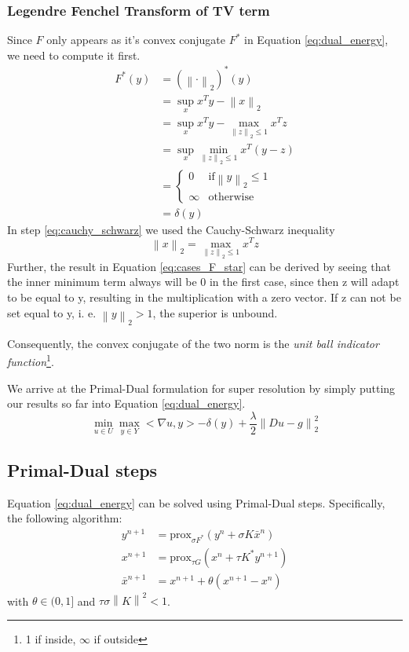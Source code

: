 \documentclass{paper}
\newcommand{\prox}{\text{prox}}
\newcommand{\norm}[1]{\left\lVert#1\right\rVert}
\newcommand{\twonorm}[1]{\left\lVert#1\right\rVert_2}
\begin{document}
\subsubsection*{Legendre Fenchel Transform of TV term}
Since $F$ only appears as it's convex conjugate $F^*$ in Equation \eqref{eq:dual_energy}, we need to compute it first.
\begin{align}
	F^*(y) &= (\norm{\cdot}_2)^*(y) \\
		  &= \sup_x x^T y - \twonorm{x} \\
		  &= \sup_x x^T y - \max_{\twonorm{z} \leq 1} x^T z \label{eq:cauchy_schwarz}\\
		  &= \sup_x \min_{\twonorm{z} \leq 1} x^T(y-z) \\
		  &= \begin{cases}
   				0  			& \text{if} \twonorm{y} \leq 1 \\
   				\infty      & \text{otherwise}
  			 \end{cases} \label{eq:cases_F_star} \\
  	      &= \delta(y)
\end{align}
In step \eqref{eq:cauchy_schwarz} we used the Cauchy-Schwarz inequality
\begin{equation}
	\twonorm{x} = \max_{\twonorm{z} \leq 1} x^T z
\end{equation}
Further, the result in Equation \eqref{eq:cases_F_star} can be derived by seeing that 
the inner minimum term always will be 0 in the first case, since then z will adapt to be
equal to y, resulting in the multiplication with a zero vector. If z can not be set equal
to y, i. e. $\twonorm{y} > 1$, the superior is unbound.

Consequently, the convex conjugate of the two norm is the \emph{unit ball indicator function}\footnote{1 if inside, $\infty$ if outside}.

We arrive at the Primal-Dual formulation for super resolution by simply putting our
results so far into Equation \eqref{eq:dual_energy}.
\begin{equation}
\min_{u \in U} \max_{y \in Y} <\nabla u, y> - \delta(y) + \frac{\lambda}{2}\twonorm{Du - g}^2
\end{equation}

\subsection*{Primal-Dual steps}
Equation \eqref{eq:dual_energy} can be solved using Primal-Dual steps. Specifically,
the following algorithm:
\begin{align}
	y^{n+1} &= \prox_{\sigma F^*}(y^n + \sigma K \bar{x}^n) \label{eq:yn1} \\
	x^{n+1} &= \prox_{\tau G}(x^n + \tau K^* y^{n+1}) \label{eq:xn1} \\
	\bar{x}^{n+1} &= x^{n+1} + \theta(x^{n+1} - x^n) \label{ex:barxn1}
\end{align}
with $\theta \in (0, 1]$ and $\tau \sigma \norm{K}^2 < 1$. 
\end{document}
